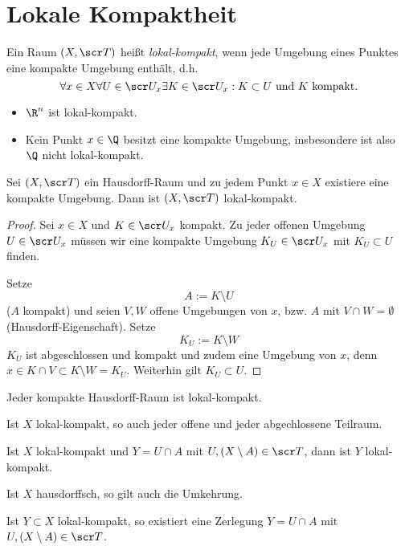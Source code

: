 \section{Lokale Kompaktheit}


\begin{df}
	Ein Raum $(X, \scr T)$ heißt \emph{lokal-kompakt}, wenn jede Umgebung eines Punktes eine kompakte Umgebung enthält, d.h.
	\[
		\forall x \in X \forall U \in \scr U_x \exists K \in \scr U_x : \text{$K \subset U$ und $K$ kompakt}.
	\]
\end{df}

\begin{ex}
	\begin{itemize}
		\item
			$\R^n$ ist lokal-kompakt.
		\item
			Kein Punkt $x\in \Q$ besitzt eine kompakte Umgebung, insbesondere ist also $\Q$ nicht lokal-kompakt.
	\end{itemize}
\end{ex}

\begin{st}
	Sei $(X, \scr T)$ ein Hausdorff-Raum und zu jedem Punkt $x \in X$ existiere eine kompakte Umgebung.
	Dann ist $(X, \scr T)$ lokal-kompakt.
	\begin{proof}
		Sei $x \in X$ und $K \in \scr U_x$ kompakt.
		Zu jeder offenen Umgebung $U \in \scr U_x$ müssen wir eine kompakte Umgebung $K_U \in \scr U_x$ mit $K_U \subset U$ finden.

		Setze
		\[
			A := K \setminus U
		\]
		($A$ kompakt) und seien $V, W$ offene Umgebungen von $x$, bzw. $A$ mit $V \cap W = \emptyset$ (Hausdorff-Eigenschaft).
		Setze
		\[
			K_U := K \setminus W
		\]
		$K_U$ ist abgeschlossen und kompakt und zudem eine Umgebung von $x$, denn $x \in K \cap V \subset K \setminus W = K_U$.
		Weiterhin gilt $K_U \subset U$.
	\end{proof}
\end{st}

\begin{kor}
	Jeder kompakte Hausdorff-Raum ist lokal-kompakt.
\end{kor}

\begin{lem}
	Ist $X$ lokal-kompakt, so auch jeder offene und jeder abgechlossene Teilraum.
\end{lem}

\begin{st}
	Ist $X$ lokal-kompakt und $Y = U \cap A$ mit $U, (X \setminus A) \in \scr T$, dann ist $Y$ lokal-kompakt.

	Ist $X$ hausdorffsch, so gilt auch die Umkehrung.

	Ist $Y \subset X$ lokal-kompakt, so existiert eine Zerlegung $Y = U \cap A$ mit $U, (X \setminus A) \in \scr T$.
\end{st}


